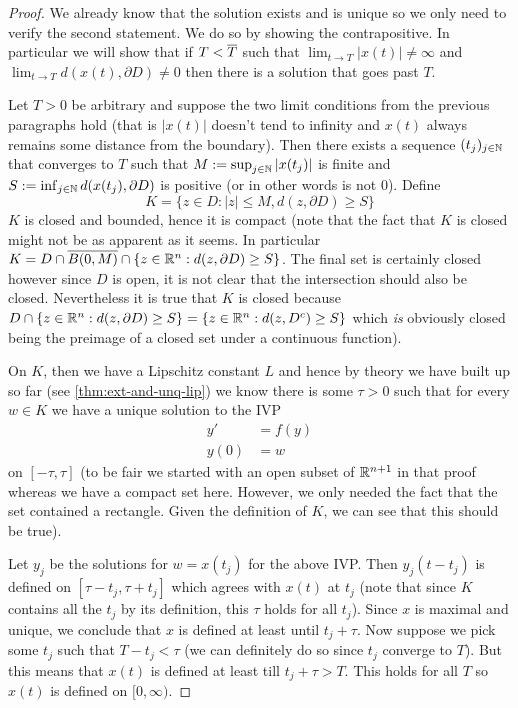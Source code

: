 \begin{proof}
    We already know that the solution exists and is unique so we only need to verify the second statement. We do so by showing the contrapositive. In particular we will show that if $T < \overline{T}$ such that $\lim_{t \to T} |x(t)| \neq \infty$ and $\lim_{t \to T} d(x(t), \partial D) \neq 0$ then there is a solution that goes past $T$.
    
    Let $T > 0$ be arbitrary and suppose the two limit conditions from the previous paragraphs hold (that is $|x(t)|$ doesn't tend to infinity and $x(t)$ always remains some distance from the boundary). Then there exists a sequence $(t_j)_{j \in \mathbb{N}}$ that converges to $T$ such that $M := \sup_{j \in \mathbb{N}} |x(t_j)|$ is finite and $S := \inf_{j \in \mathbb{N}} d(x(t_j), \partial D)$ is positive (or in other words is not 0). Define 
    $$ K = \{z \in D : |z| \leq M, d(z, \partial D) \geq S\} $$
    $K$ is closed and bounded, hence it is compact (note that the fact that $K$ is closed might not be as apparent as it seems. In particular $K = D \cap \overline{B(0, M)} \cap \{z \in \mathbb{R}^n : d(z, \partial D) \geq S\}$. The final set is certainly closed however since $D$ is open, it is not clear that the intersection should also be closed. Nevertheless it is true that $K$ is closed because $D \cap \{z \in \mathbb{R}^n : d(z, \partial D) \geq S\} = \{z \in \mathbb{R}^n : d(z, D^c) \geq S\}$ which \textit{is} obviously closed being the preimage of a closed set under a continuous function).
    
    On $K$, then we have a Lipschitz constant $L$ and hence by theory we have built up so far (see \autoref{thm:ext-and-unq-lip}) we know there is some $\tau > 0$ such that for every $w \in K$ we have a unique solution to the IVP
    \begin{align*}
        y' &= f(y)\\
        y(0) &= w
    \end{align*}
    on $[-\tau, \tau]$ (to be fair we started with an open subset of $\mathbb{R}^{n + 1}$ in that proof whereas we have a compact set here. However, we only needed the fact that the set contained a rectangle. Given the definition of $K$, we can see that this should be true). 
    
    Let $y_j$ be the solutions for $w = x(t_j)$ for the above IVP. Then $y_j(t - t_j)$ is defined on $[\tau - t_j, \tau + t_j]$ which agrees with $x(t)$ at $t_j$ (note that since $K$ contains all the $t_j$ by its definition, this $\tau$ holds for all $t_j$). Since $x$ is maximal and unique, we conclude that $x$ is defined at least until $t_j + \tau$. Now suppose we pick some $t_j$ such that $T - t_j < \tau$ (we can definitely do so since $t_j$ converge to $T$). But this means that $x(t)$ is defined at least till $t_j + \tau > T$. This holds for all $T$ so $x(t)$ is defined on $[0, \infty)$.
\end{proof}

